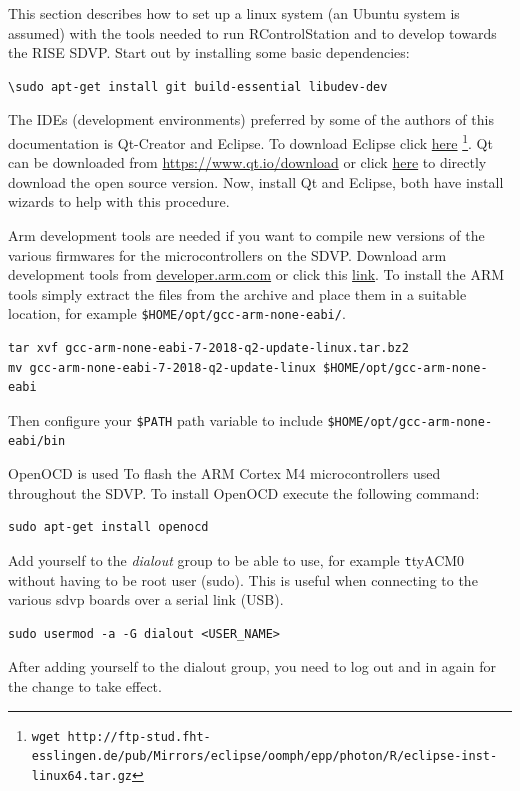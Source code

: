 \documentclass[12pt]{article} %
\begin{document}
This section describes how to set up a linux system (an Ubuntu system
is assumed) with the tools needed to run RControlStation and to
develop towards the RISE SDVP. Start out by installing some basic
dependencies:

\begin{Verbatim}
\sudo apt-get install git build-essential libudev-dev
\end{Verbatim}

The IDEs (development environments) preferred by some of the authors of
this documentation is Qt-Creator and Eclipse. To download Eclipse
click
\href{http://ftp-stud.fht-esslingen.de/pub/Mirrors/eclipse/oomph/epp/photon/R/eclipse-inst-linux64.tar.gz}{here}
\footnote{\texttt{\tiny{wget
      http://ftp-stud.fht-esslingen.de/pub/Mirrors/eclipse/oomph/epp/photon/R/eclipse-inst-linux64.tar.gz}}}.
Qt can be downloaded from \url{https://www.qt.io/download} or click
\href{http://download.qt.io/official_releases/online_installers/qt-unified-linux-x64-online.run}{here}
to directly download the open source version. Now, install Qt and
Eclipse, both have install wizards to help with this procedure. 

Arm development tools are needed if you want to compile new versions
of the various firmwares for the microcontrollers on the
SDVP. Download arm development tools from \url{developer.arm.com} or
click this
\href{https://developer.arm.com/-/media/Files/downloads/gnu-rm/7-2018q2/gcc-arm-none-eabi-7-2018-q2-update-linux.tar.bz2?revision=bc2c96c0-14b5-4bb4-9f18-bceb4050fee7?product=GNU%20Arm%20Embedded%20Toolchain,64-bit,,Linux,7-2018-q2-update}{link}. 
  To install the ARM tools simply extract the files from the archive
  and place them in a suitable location, for example \texttt{\$HOME/opt/gcc-arm-none-eabi/}.
\begin{Verbatim}
tar xvf gcc-arm-none-eabi-7-2018-q2-update-linux.tar.bz2
mv gcc-arm-none-eabi-7-2018-q2-update-linux $HOME/opt/gcc-arm-none-eabi
\end{Verbatim} 
Then configure your \texttt{\$PATH} path variable to include \texttt{\$HOME/opt/gcc-arm-none-eabi/bin}

OpenOCD is used To flash the ARM Cortex M4 microcontrollers used throughout the SDVP.
To install OpenOCD execute the following command: 
\begin{Verbatim}
sudo apt-get install openocd
\end{Verbatim} 

Add yourself to the {\em dialout} group to be able to use, for example
{\texttt ttyACM0} without having to be root user (sudo). This is useful when connecting to
the various sdvp boards over a serial link (USB). 
\begin{Verbatim}
sudo usermod -a -G dialout <USER_NAME> 
\end{Verbatim}
After adding yourself to the dialout group, you need to log out and in again
for the change to take effect. 
\end{document}
